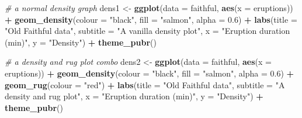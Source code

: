 \documentclass[english,10pt,a4paper,oneside]{book}
\newenvironment{Shaded}{\begin{snugshade}}{\end{snugshade}}
\newcommand{\KeywordTok}[1]{\textcolor[rgb]{0.13,0.29,0.53}{\textbf{#1}}}
\newcommand{\DataTypeTok}[1]{\textcolor[rgb]{0.13,0.29,0.53}{#1}}
\newcommand{\FloatTok}[1]{\textcolor[rgb]{0.00,0.00,0.81}{#1}}
\newcommand{\StringTok}[1]{\textcolor[rgb]{0.31,0.60,0.02}{#1}}
\newcommand{\CommentTok}[1]{\textcolor[rgb]{0.56,0.35,0.01}{\textit{#1}}}
\newcommand{\OperatorTok}[1]{\textcolor[rgb]{0.81,0.36,0.00}{\textbf{#1}}}
\newcommand{\NormalTok}[1]{#1}
\theoremstyle{definition}
\theoremstyle{definition}
\theoremstyle{definition}
\theoremstyle{remark}
\begin{document}
\begin{Shaded}
\begin{Highlighting}[]
\CommentTok{# a normal density graph}
\NormalTok{dens1 <-}\StringTok{ }\KeywordTok{ggplot}\NormalTok{(}\DataTypeTok{data =}\NormalTok{ faithful, }\KeywordTok{aes}\NormalTok{(}\DataTypeTok{x =}\NormalTok{ eruptions)) }\OperatorTok{+}
\StringTok{  }\KeywordTok{geom_density}\NormalTok{(}\DataTypeTok{colour =} \StringTok{"black"}\NormalTok{, }\DataTypeTok{fill =} \StringTok{"salmon"}\NormalTok{, }\DataTypeTok{alpha =} \FloatTok{0.6}\NormalTok{) }\OperatorTok{+}
\StringTok{  }\KeywordTok{labs}\NormalTok{(}\DataTypeTok{title =} \StringTok{"Old Faithful data"}\NormalTok{,}
       \DataTypeTok{subtitle =} \StringTok{"A vanilla density plot"}\NormalTok{,}
       \DataTypeTok{x =} \StringTok{"Eruption duration (min)"}\NormalTok{,}
       \DataTypeTok{y =} \StringTok{"Density"}\NormalTok{) }\OperatorTok{+}\StringTok{ }\KeywordTok{theme_pubr}\NormalTok{()}

\CommentTok{# a density and rug plot combo}
\NormalTok{dens2 <-}\StringTok{ }\KeywordTok{ggplot}\NormalTok{(}\DataTypeTok{data =}\NormalTok{ faithful, }\KeywordTok{aes}\NormalTok{(}\DataTypeTok{x =}\NormalTok{ eruptions)) }\OperatorTok{+}
\StringTok{  }\KeywordTok{geom_density}\NormalTok{(}\DataTypeTok{colour =} \StringTok{"black"}\NormalTok{, }\DataTypeTok{fill =} \StringTok{"salmon"}\NormalTok{, }\DataTypeTok{alpha =} \FloatTok{0.6}\NormalTok{) }\OperatorTok{+}
\StringTok{  }\KeywordTok{geom_rug}\NormalTok{(}\DataTypeTok{colour =} \StringTok{"red"}\NormalTok{) }\OperatorTok{+}
\StringTok{  }\KeywordTok{labs}\NormalTok{(}\DataTypeTok{title =} \StringTok{"Old Faithful data"}\NormalTok{,}
       \DataTypeTok{subtitle =} \StringTok{"A density and rug plot"}\NormalTok{,}
       \DataTypeTok{x =} \StringTok{"Eruption duration (min)"}\NormalTok{,}
       \DataTypeTok{y =} \StringTok{"Density"}\NormalTok{) }\OperatorTok{+}\StringTok{ }\KeywordTok{theme_pubr}\NormalTok{()}


\end{Highlighting}
\end{Shaded}
\end{document}
